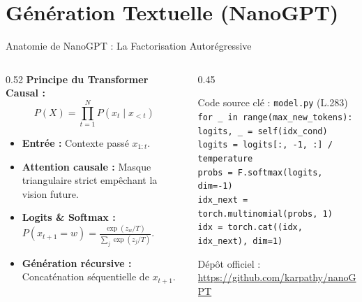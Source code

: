 \documentclass[aspectratio=169, 10pt, table]{beamer}
\begin{document}
\section{Génération Textuelle (NanoGPT)}

\begin{frame}{Anatomie de NanoGPT : La Factorisation Autorégressive}
    \begin{columns}[T]
        \begin{column}{0.52\textwidth}
            \textbf{Principe du Transformer Causal :}
            \vspace{-0.1cm}
            $$P(X) = \prod_{t=1}^N P(x_t \mid x_{<t})$$
            \vspace{-0.3cm}
            \small
            \begin{itemize}
                \item \textbf{Entrée :} Contexte passé $x_{1:t}$.
                \item \textbf{Attention causale :} Masque triangulaire strict empêchant la vision future.
                \item \textbf{Logits \& Softmax :} $P(x_{t+1} = w) = \frac{\exp(z_w / T)}{\sum_j \exp(z_j / T)}$.
                \item \textbf{Génération récursive :} Concaténation séquentielle de $x_{t+1}$.
            \end{itemize}
        \end{column}

        \begin{column}{0.45\textwidth}
            \begin{block}{Code source clé : \texttt{model.py} (L.283)}
                \scriptsize
                \texttt{for \_ in range(max\_new\_tokens):}\\
                \quad\texttt{logits, \_ = self(idx\_cond)}\\
                \quad\texttt{logits = logits[:, -1, :] / temperature}\\
                \quad\texttt{probs = F.softmax(logits, dim=-1)}\\
                \quad\texttt{idx\_next = torch.multinomial(probs, 1)}\\
                \quad\texttt{idx = torch.cat((idx, idx\_next), dim=1)}
            \end{block}
            \vspace{0.15cm}
            {\scriptsize Dépôt officiel : \url{https://github.com/karpathy/nanoGPT}}
        \end{column}
    \end{columns}
\end{frame}
\end{document}
